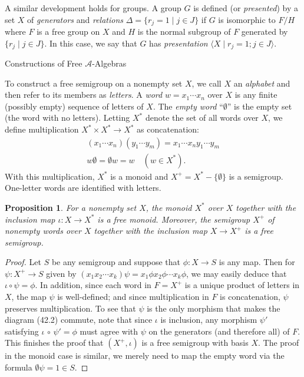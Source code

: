 \documentclass{surv-l}
\numberwithin{equation}{section}
\numberwithin{table}{section}
\numberwithin{figure}{section}
\theoremstyle{plain}
\newtheorem{proposition}[equation]{Proposition}
\theoremstyle{definition}
\begin{document}
A similar development holds for groups. A group $G$ is defined (or
\emph{presented}) by
a set $X$ of \emph{generators} and \emph{relations}
$\Delta=\{r_{j}=1\mid j\in J\}$ if $G$ is isomorphic to
$F/H$ where $F$ is a free group on $X$ and $H$ is the normal
subgroup of $F$ generated by $\{r_{j}\mid j\in J\}$. In this
case, we say that $G$ has \emph{presentation} $\langle X\mid
r_{j}=1;j\in J\rangle$.

Constructions of Free $\mathcal{A}$-Algebras

To construct a free semigroup on a nonempty set $X$, we call $X$
an \emph{alphabet} and then refer to
its members as \emph{letters}. A \emph{word} $w=x_{1}\cdots x_{n}$
over $X$ is any finite (possibly empty) sequence of letters of
$X$. The \emph{empty word} ``$\emptyset$'' is
the empty set (the word with no letters). Letting $X^{\ast}$
denote the set of all words over $X$, we define multiplication
$X^{\ast}\times X^{\ast}\rightarrow X^{\ast}$ as concatenation:
\begin{gather*}
(x_{1}\cdots x_{n})(y_{1}\cdots y_{m})=x_{1}\cdots x_{n}y_{1}\cdots y_{m} \\
w\emptyset=\emptyset w=w\quad (w\in X^{\ast}).
\end{gather*}
With this multiplication, $X^{\ast}$ is a monoid and
$X^{+}=X^{\ast}-\{\emptyset\}$ is a semigroup. One-letter words
are identified with letters.

\begin{proposition}\label{prop9.42.4}
For a nonempty set $X$, the monoid $X^{\ast}$ over $X$ together
with the inclusion map $\iota : X\rightarrow X^{\ast}$ is a free
monoid. Moreover, the semigroup $X^{+}$ of
nonempty words over $X$ together with the inclusion map
$X\rightarrow X^{+}$ is a free semigroup.
\end{proposition}

\begin{proof}
Let $S$ be any semigroup and suppose that $\phi : X\rightarrow S$
is any map. Then for $\psi : X^{+}\rightarrow S$ given by
$(x_{1}x_{2}\cdots x_{k})\psi=x_{1}\phi x_{2}\phi\cdots
x_{k}\phi$, we may easily deduce that $\iota \circ\psi=\phi$. In
addition, since each word in $F=X^{+}$ is a unique product of
letters in $X$, the map $\psi$ is well-defined; and since
multiplication in $F$ is concatenation, $\psi$ preserves
multiplication. To see that $\psi$ is the only morphism that makes
the diagram (42.2) commute, note that since $\iota$ is
inclusion, any morphism $\psi'$ satisfying $\iota\,\circ\,\psi'=\phi$
must agree with $\psi$ on the generators (and therefore all) of
$F$. This finishes the proof that $(X^{+}, \iota)$ is a free
semigroup with basis $X$. The proof in the monoid case is similar,
we merely need to map the empty word via the formula
$\emptyset\psi=1\in S$.
\end{proof}
\end{document}
